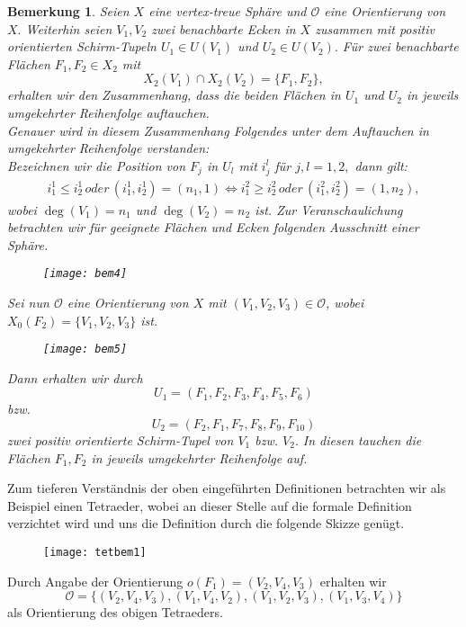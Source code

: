 \documentclass[12pt,titlepage,twoside,cleardoublepage]{article}
\theoremstyle{nummermitklammern}
\newtheorem{bemerkung}[temp]{Bemerkung}
\newtheorem{bemerkung}[zahl]{Bemerkung}
\numberwithin{equation}{section}
\begin{document}
\begin{bemerkung}
Seien $X$ eine vertex-treue Sphäre und $\mathcal{O}$ eine Orientierung von $X.$ Weiterhin seien $V_1,V_2$ zwei benachbarte Ecken in $X$ zusammen mit positiv orientierten Schirm-Tupeln $U_1\in U(V_1)$ und $U_2\in U(V_2).$ Für zwei benachbarte Flächen $F_1,F_2\in X_2$ mit 
\[
X_2(V_1)\cap X_2(V_2)=\{F_1,F_2\},
\]
erhalten wir den Zusammenhang, dass die beiden Flächen in $U_1$ und  $U_2$ in jeweils umgekehrter Reihenfolge auftauchen.\\
Genauer wird in diesem Zusammenhang Folgendes unter dem Auftauchen in umgekehrter Reihenfolge verstanden:\\ 
Bezeichnen wir die Position von $F_j$ in $U_l$ mit $i_j^l$ für $j,l=1,2,$ dann gilt:
\begin{align*}
i^1_1\leq i_2^1 \, oder \, (i_1^1,i^1_2)=(n_1,1)\Leftrightarrow i^2_1\geq i_2^2 \, oder \, (i_1^2,i^2_2)=(1,n_2),
\end{align*}
wobei $\deg(V_1)=n_1$ und $\deg(V_2)=n_2$ ist.
Zur Veranschaulichung betrachten wir für geeignete Flächen und Ecken folgenden Ausschnitt einer Sphäre. 
\begin{figure}[H]
\begin{center}
\texttt{[image: bem4]}
\end{center}
\end{figure}
Sei nun $\mathcal{O}$ eine Orientierung von $X$ mit $(V_1,V_2,V_3)\in \mathcal{O}$, wobei $X_0(F_2)=\{V_1,V_2,V_3\}$ ist.
\begin{figure}[H]
\begin{center}
\texttt{[image: bem5]}
\end{center}
\end{figure}

Dann erhalten wir durch 
\[
U_1=(F_1,F_2,F_3,F_4,F_5,F_6)
\]
bzw.
\[
U_2=(F_2,F_1,F_7,F_8,F_9,F_{10})
\]
zwei positiv orientierte Schirm-Tupel von $V_1$ bzw. $V_2.$ In diesen tauchen die Flächen $F_1,F_2$ in jeweils umgekehrter Reihenfolge auf. 
\end{bemerkung}
Zum tieferen Verständnis der oben eingeführten Definitionen betrachten wir als Beispiel einen Tetraeder, wobei an dieser Stelle auf die formale Definition verzichtet wird und uns die Definition durch die folgende Skizze genügt.
\begin{figure}[H]
\begin{center}
\texttt{[image: tetbem1]}
\end{center}
\end{figure} 
Durch Angabe der Orientierung $o(F_1)=(V_2,V_4,V_3)$ erhalten wir
\[
\mathcal{O}=\{(V_2,V_4,V_3),(V_1,V_4,V_2),(V_1,V_2,V_3),(V_1,V_3,V_4)\}
\] 
als Orientierung des obigen Tetraeders.
 
\end{document}
